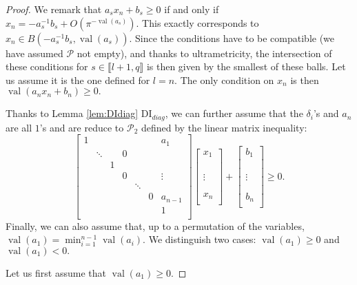 \documentclass[a4paper,oneside,10pt]{article}
\newcommand{\PP}{\mathcal{P}}
\DeclareMathOperator{\val}{val}
\begin{document}
\begin{proof}
We remark that 
$a_s x_n + b_s \geq 0$
if and only if $x_n = -a_s^{-1} b_s + O(\pi^{- \val(a_s)}).$
This exactly corresponds to $x_n \in B(-a_s^{-1} b_s,\val(a_s)).$
Since the conditions have to be compatible (we have assumed
$\PP$ not empty), and thanks to ultrametricity,  
the intersection of these conditions for 
$s \in \llbracket l+1,q \rrbracket$
is then given by the smallest of these balls.
Let us assume it is the one defined for $l=n.$
The only condition on $x_n$
is then $\val(a_nx_n +b_n) \geq 0.$

Thanks to Lemma \ref{lem:DIdiag} DI${}_{diag}$,
we can further assume that the $\delta_i$'s and $a_n$ are all $1$'s
and are reduce to $\PP_2$ defined by the linear matrix inequality:
\[  \begin{bmatrix}
1	& 		& 			&   &		 &  &a_1	\\
			& \ddots& 			& 0	&		 &	&		\\
			&		& 1  &   & 		 &	& \\
			&		&			&0  & 		 &	& 	\vdots	\\
			&		&			&   & \ddots &	&		\\
			&		&			&	&		 & 0&a_{n-1} \\
			&		&			&	&		 &	&1 	\\
		
\end{bmatrix} \begin{bmatrix} x_1 \\ \\  \\ \\ \vdots \\  \\ \\ x_n \\ \end{bmatrix} + \begin{bmatrix} b_1 \\ \\ \\  \\ \vdots  \\ \\ \\ b_n \\ \end{bmatrix}  \geq 0.\]
Finally, we can also assume that, up to a permutation of the variables, $\val(a_1)= \min_{i=1}^{n-1} \val(a_i).$
We distinguish two cases: $\val(a_1) \geq 0$ and $\val(a_1)<0.$

Let us first assume that $\val(a_1) \geq 0$.


\end{proof}
\end{document}
